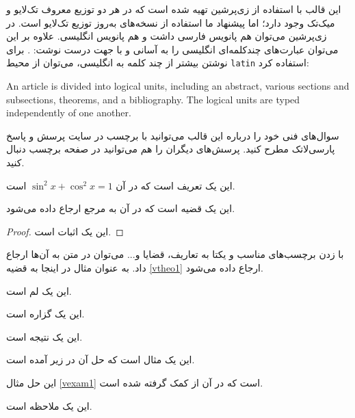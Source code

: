 \documentclass[aimcpersian]{aimc46}
\begin{document}
این قالب با استفاده از زی‌پرشین تهیه شده است که در هر دو توزیع معروف تک‌لایو و میک‌تک وجود دارد؛ اما پیشنهاد ما استفاده از نسخه‌های
به‌روز توزیع تک‌لایو است. در زی‌پرشین می‌توان هم پانویس فارسی داشت و هم پانویس 
انگلیسی. علاوه بر این می‌توان عبارت‌های چندکلمه‌ای انگلیسی را به آسانی و با جهت درست نوشت: 
.
برای نوشتن بیشتر از چند کلمه به انگلیسی، می‌توان از محیط \texttt{latin} استفاده کرد:
\begin{latin}
 An article is divided into logical units, including an abstract, various sections and subsections, theorems,
 and a bibliography.  The logical units are typed independently of one another.
\end{latin}
سوال‌های فنی خود را درباره این قالب  می‌توانید  با برچسب  در سایت پرسش و پاسخ
پارسی‌لاتک%
 مطرح کنید. پرسش‌های دیگران را هم می‌توانید در صفحه برچسب 
%
دنبال کنید.
\begin{definition}
این یک تعریف است که در آن $\sin^2 x+ \cos^2 x=1$ است.
\end{definition}
\begin{theorem}\label{vtheo1}
این یک قضیه است که در آن به مرجع \cite{folland} ارجاع داده می‌شود.

\end{theorem}
\begin{proof}
این یک اثبات است.
\end{proof}
با زدن برچسب‌های مناسب و یکتا به تعاریف، قضایا و... می‌توان در متن به آن‌ها ارجاع داد. به عنوان مثال در اینجا به قضیه \ref{vtheo1}
ارجاع داده می‌شود.
\begin{lemma}
این یک لم است.
\end{lemma}
\begin{proposition}
این یک گزاره است.
\end{proposition}
\begin{corollary}
این یک نتیجه است.
\end{corollary}
\begin{example}\label{vexam1}
این یک مثال است که حل آن در زیر آمده است.
\end{example}
\begin{solution}
این حل مثال \ref{vexam1} است که در آن از \cite{alvarezart} کمک گرفته شده است.
\end{solution}
\begin{remark}
این یک ملاحظه است.
\end{remark}
\end{document}
